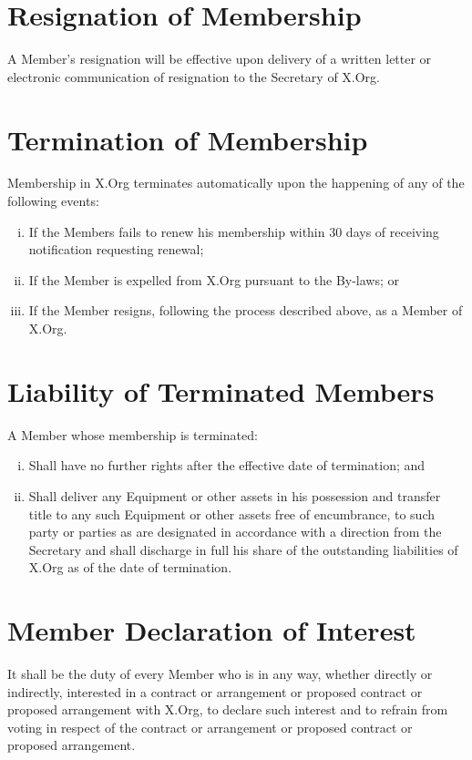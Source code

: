 \documentclass[10pt, english]{xorgdocs}
\begin{document}
\section{Resignation of Membership}
A Member's resignation will be effective upon delivery of a written letter or
electronic communication of resignation to the Secretary of X.Org.

\section{Termination of Membership}
Membership in X.Org terminates automatically upon the happening of any of the
following events:

\begin{enumerate}[(i)\hspace{.2cm}]
	\item If the Members fails to renew his membership within 30 days of
	receiving notification requesting renewal;

	\item If the Member is expelled from X.Org pursuant to the By-laws; or

	\item If the Member resigns, following the process described above, as a
	Member of X.Org.
\end{enumerate}

\section{Liability of Terminated Members}
A Member whose membership is terminated:

\begin{enumerate}[(i)\hspace{.2cm}]
	\item Shall have no further rights after the effective date of
	termination; and

	\item Shall deliver any Equipment or other assets in his possession and
	transfer title to any such Equipment or other assets free of
	encumbrance, to such party or parties as are designated in accordance
	with a direction from the Secretary and shall discharge in full his
	share of the outstanding liabilities of X.Org as of the date of
	termination.
\end{enumerate}

\section{Member Declaration of Interest}
It shall be the duty of every Member who is in any way, whether directly or
indirectly, interested in a contract or arrangement or proposed contract or
proposed arrangement with X.Org, to declare such interest and to refrain from
voting in respect of the contract or arrangement or proposed contract or
proposed arrangement.
\end{document}
